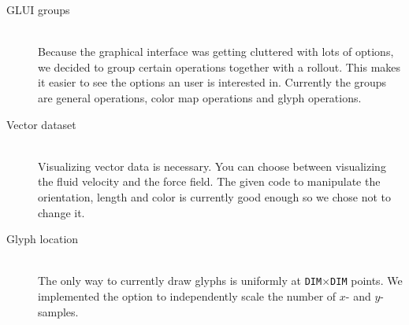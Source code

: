 \begin{description}
 \item [GLUI groups] ~\\Because the graphical interface was getting cluttered with lots of options, we decided to group certain operations together with a rollout. This makes it easier to see the options an user is interested in. Currently the groups are general operations, color map operations and glyph operations.
 \item[Vector dataset] ~\\Visualizing vector data is necessary. You can choose between visualizing the fluid velocity and the force field. The given code to manipulate the orientation, length and color is currently good enough so we chose not to change it. 
 \item[Glyph location] ~\\
 The only way to currently draw glyphs is uniformly at \texttt{DIM}$\times$\texttt{DIM} points. We implemented the option to independently scale the number of $x$- and $y$-samples. 
\end{description}
